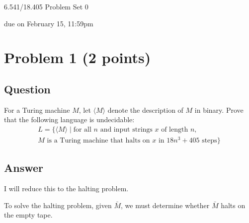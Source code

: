 \documentclass{article}
\begin{document}
	\begin{center}
		\Large
		6.541/18.405 Problem Set 0
		
		\vspace{3pt}
		\normalsize
		due on February 15, 11:59pm
	\end{center}
	
	
	
		
	\section*{Problem 1 (2 points)} 
	\subsection*{Question}
    For a Turing machine $M$, let $\langle M \rangle$ denote the description of $M$ in binary.
    Prove that the following language is undecidable: 
	\begin{multline*}
		L = \{ \langle M\rangle \mid \text{for all $n$ and input strings $x$ of length $n$, } \\
		\text{$M$ is a Turing machine that halts on $x$ in $18n^3+405$ steps} \}
	\end{multline*}

	\subsection*{Answer}

	I will reduce this to the halting problem.

	To solve the halting problem, given $\bar{M}$, we must determine whether $\bar{M}$ halts on the empty tape.
\end{document}
